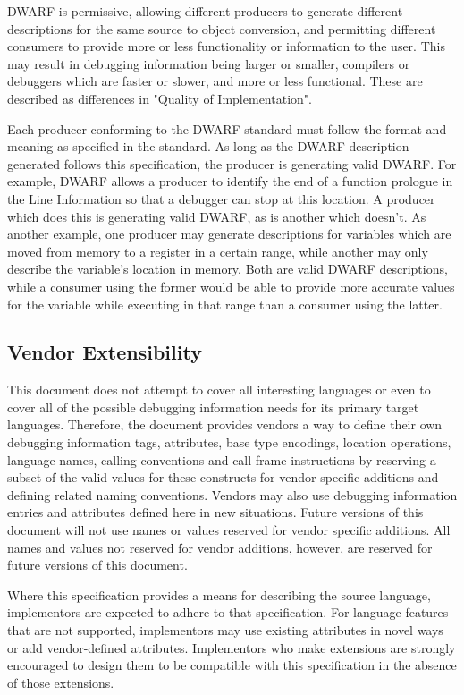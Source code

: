 DWARF is permissive, allowing different producers to generate different
descriptions for the same source to object conversion, and permitting
different consumers to provide more or less functionality or information
to the user.  This may result in debugging information being larger or
smaller, compilers or debuggers which are faster or slower, and more or
less functional.  These are described as differences in "Quality of
Implementation".

Each producer conforming to the DWARF standard must follow the format and
meaning as specified in the standard.  As long as the DWARF description
generated follows this specification, the producer is generating valid DWARF.
For example, DWARF allows a producer to identify the end of a function
prologue in the Line Information so that a debugger can stop at this location.
A producer which does this is generating valid DWARF, as is another which
doesn't.  As another example, one producer may generate descriptions
for variables which are moved from memory to a register in a certain range,
while another may only describe the variable's location in memory.  Both are
valid DWARF descriptions, while a consumer using the former would be able
to provide more accurate values for the variable while executing in that
range than a consumer using the latter.
\eb

\subsection{Vendor Extensibility}
This document does not attempt to cover all interesting
languages or even to cover all of the possible debugging
information needs for its primary target languages. 
Therefore,
the document provides vendors a way to define their own
debugging information tags, attributes, base type encodings,
location operations, language names, calling conventions and
call frame instructions by reserving a subset of the valid
values for these constructs for vendor specific additions
and defining related naming conventions. 
Vendors may also use
debugging information entries and attributes defined here in
new situations. 
Future versions of this document will not use
names or values reserved for vendor specific additions. 
All names and values not reserved for vendor additions, however,
are reserved for future versions of this document.

Where this specification provides a means for
describing the source language, implementors are expected
to adhere to that specification. 
For language features that
are not supported, implementors may use existing attributes
in novel ways or add vendor-defined attributes. 
Implementors
who make extensions are strongly encouraged to design them
to be compatible with this specification in the absence of
those extensions.

